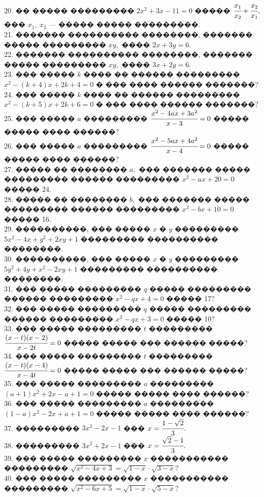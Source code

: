 \documentclass[12pt]{article}
\begin{document}
20. �� ����� ��������� $2x^2+3x-11=0$ ����� $\cfrac{x_1}{x_2}+\cfrac{x_2}{x_1},$ ��� $x_1,\ x_2$ --- ����� ����� ���������.\\
21. ������� ���������� ��������, ������� ����� ��������� $xy,$ ���� $2x+3y=6.$\\
22. ������� ���������� ��������, ������� ����� ��������� $xy,$ ���� $3x+2y=6.$\\
23. ��� ����� $k$ ���� �� ������ ��������� $x^2-(k+4)x+2k+4=0$ � ��� ���� ������ �������?\\
24. ��� ����� $k$ ���� �� ������ ��������� $x^2-(k+5)x+2k+6=0$ � ��� ���� ������ �������?\\
25. ��� ����� $a$ ��������� $\cfrac{x^2-4ax+3a^2}{x-3}=0$ ����� ����� ���� ������?\\
26. ��� ����� $a$ ��������� $\cfrac{x^2-5ax+4a^2}{x-4}=0$ ����� ����� ���� ������?\\
27. ����� �� �������� $a,$ ��� ������� ����� ��������� ������ ��������� $x^2-ax+20=0$ ����� 24.\\
28. ����� �� �������� $b,$ ��� ������� ����� ��������� ������ ��������� $x^2-bx+10=0$ ����� 16.\\
29. ����������, ��� ����� $x$ � $y$ ��������� $5x^2-4x+y^2+2xy+1$ ��������� ���������� ��������.\\
30. ����������, ��� ����� $x$ � $y$ ��������� $5y^2+4y+x^2-2xy+1$ ��������� ���������� ��������.\\
31. ��� ����� ��������� $q$ ����� ��������� ������ ��������� $x^2-qx+4=0$ ����� 17?\\
32. ��� ����� ��������� $q$ ����� ��������� ������ ��������� $x^2-qx+3=0$ ����� 10?\\
33. ��� ����� ��������� $t$ ��������� $\cfrac{(x-t)(x-2)}{x-2t}=0$ ����� ����� ��� ������ �����?\\
34. ��� ����� ��������� $t$ ��������� $\cfrac{(x-t)(x-4)}{x-4t}=0$ ����� ����� ��� ������ �����?\\
35. ��� ����� ��������� $a$ ��������� $(a+1)x^2+2x-a+1=0$ ����� ����� ���� ������?\\
36. ��� ����� ��������� $a$ ��������� $(1-a)x^2-2x+a+1=0$ ����� ����� ���� ������?\\
37. ��������� $3x^2-2x-1$ ��� $x=\cfrac{1-\sqrt{2}}{3}.$\\
38. ��������� $3x^2+2x-1$ ��� $x=\cfrac{\sqrt{2}-1}{3}.$\\
39. ��� ����� ��������� $x$ ����������� ��������� $\sqrt{x^2-4x+3}=\sqrt{1-x}\cdot\sqrt{3-x}?$\\
40. ��� ����� ��������� $x$ ����������� ��������� $\sqrt{x^2-6x+5}=\sqrt{1-x}\cdot\sqrt{5-x}?$\\
\end{document}

